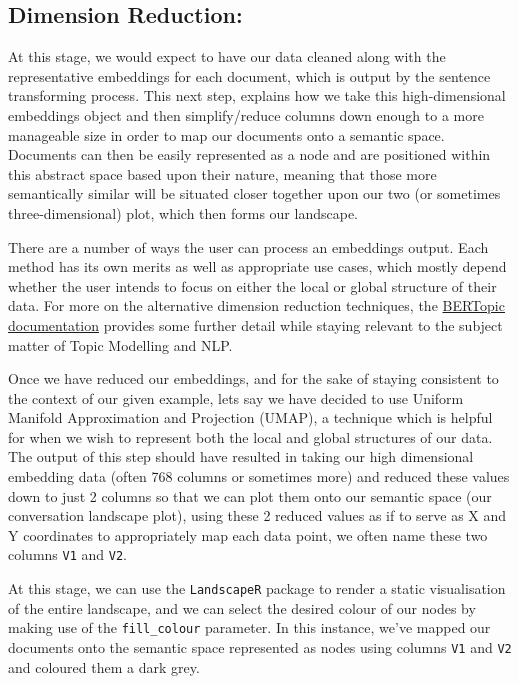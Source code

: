 \documentclass[
  letterpaper,
  DIV=11,
  numbers=noendperiod]{scrreprt}
\begin{document}
\subsection{Dimension Reduction:}\label{dimension-reduction}

At this stage, we would expect to have our data cleaned along with the
representative embeddings for each document, which is output by the
sentence transforming process. This next step, explains how we take this
high-dimensional embeddings object and then simplify/reduce columns down
enough to a more manageable size in order to map our documents onto a
semantic space. Documents can then be easily represented as a node and
are positioned within this abstract space based upon their nature,
meaning that those more semantically similar will be situated closer
together upon our two (or sometimes three-dimensional) plot, which then
forms our landscape.

There are a number of ways the user can process an embeddings output.
Each method has its own merits as well as appropriate use cases, which
mostly depend whether the user intends to focus on either the local or
global structure of their data. For more on the alternative dimension
reduction techniques, the
\href{https://maartengr.github.io/BERTopic/getting_started/dim_reduction/dim_reduction.html}{BERTopic
documentation} provides some further detail while staying relevant to
the subject matter of Topic Modelling and NLP.

Once we have reduced our embeddings, and for the sake of staying
consistent to the context of our given example, lets say we have decided
to use Uniform Manifold Approximation and Projection (UMAP), a technique
which is helpful for when we wish to represent both the local and global
structures of our data. The output of this step should have resulted in
taking our high dimensional embedding data (often 768 columns or
sometimes more) and reduced these values down to just 2 columns so that
we can plot them onto our semantic space (our conversation landscape
plot), using these 2 reduced values as if to serve as X and Y
coordinates to appropriately map each data point, we often name these
two columns \texttt{V1} and \texttt{V2}.

At this stage, we can use the \texttt{LandscapeR} package to render a
static visualisation of the entire landscape, and we can select the
desired colour of our nodes by making use of the \texttt{fill\_colour}
parameter. In this instance, we've mapped our documents onto the
semantic space represented as nodes using columns \texttt{V1} and
\texttt{V2} and coloured them a dark grey.
\end{document}
